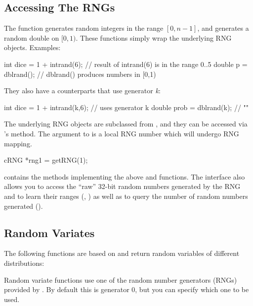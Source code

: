\subsection{Accessing The RNGs}

The  function generates random integers in the range $[0, n-1]$, and
 generates a random double on $[0,1)$. These functions
simply wrap the underlying RNG objects. Examples:

\begin{cpp}
int dice = 1 + intrand(6); // result of intrand(6) is in the range 0..5
double p = dblrand();      // dblrand() produces numbers in [0,1)
\end{cpp}

They also have a counterparts that use generator \textit{k}:

\begin{cpp}
int dice = 1 + intrand(k,6); // uses generator k
double prob = dblrand(k);    // ""
\end{cpp}

The underlying RNG objects are subclassed from ,
and they can be accessed via 's  method.
The argument to  is a local RNG number which will undergo
RNG mapping.

\begin{cpp}
cRNG *rng1 = getRNG(1);
\end{cpp}

 contains the methods implementing the above 
and  functions. The  interface also allows
you to access the ``raw'' 32-bit random numbers generated by the RNG
and to learn their ranges (, ) as well as
to query the number of random numbers generated ().


\subsection{Random Variates}

The following functions are based on  and return
random variables of different distributions:

Random variate functions use one of the random number generators (RNGs)
provided by {\opp}. By default this is generator 0, but you can specify
which one to be used.


